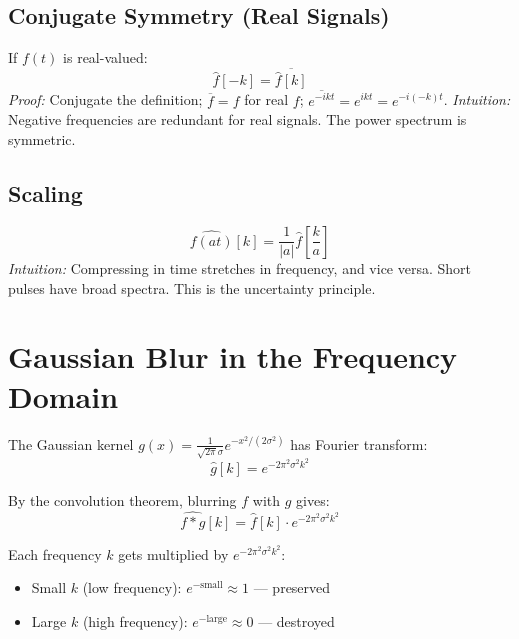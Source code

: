 \documentclass[11pt,a4paper]{article}
\theoremstyle{definition}
\begin{document}
\subsection{Conjugate Symmetry (Real Signals)}
If $f(t)$ is real-valued:
\begin{equation}
    \hat{f}[-k] = \overline{\hat{f}[k]}
\end{equation}
\textit{Proof:} Conjugate the definition; $\overline{f} = f$ for real $f$; $\overline{e^{-ikt}} = e^{ikt} = e^{-i(-k)t}$. \quad
\textit{Intuition:} Negative frequencies are redundant for real signals. The power spectrum is symmetric.

\subsection{Scaling}
\begin{equation}
    \widehat{f(at)}[k] = \frac{1}{|a|} \hat{f}\!\left[\frac{k}{a}\right]
\end{equation}
\textit{Intuition:} Compressing in time stretches in frequency, and vice versa. Short pulses have broad spectra. This is the uncertainty principle.

\section{Gaussian Blur in the Frequency Domain}

The Gaussian kernel $g(x) = \frac{1}{\sqrt{2\pi}\sigma} e^{-x^2/(2\sigma^2)}$ has Fourier transform:
\begin{equation}
    \hat{g}[k] = e^{-2\pi^2 \sigma^2 k^2}
\end{equation}

By the convolution theorem, blurring $f$ with $g$ gives:
\begin{equation}
    \widehat{f * g}[k] = \hat{f}[k] \cdot e^{-2\pi^2 \sigma^2 k^2}
\end{equation}

Each frequency $k$ gets multiplied by $e^{-2\pi^2\sigma^2 k^2}$:
\begin{itemize}
    \item Small $k$ (low frequency): $e^{-\text{small}} \approx 1$ --- preserved
    \item Large $k$ (high frequency): $e^{-\text{large}} \approx 0$ --- destroyed
\end{itemize}
\end{document}
